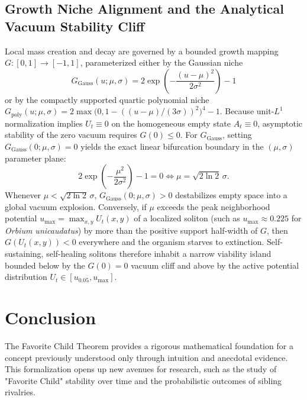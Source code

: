 \documentclass[12pt]{article}
\begin{document}
\subsection{Growth Niche Alignment and the Analytical Vacuum Stability Cliff}

Local mass creation and decay are governed by a bounded growth mapping \( G : [0, 1] \to [-1, 1] \), parameterized either by the Gaussian niche
\begin{equation}
G_{\text{Gauss}}(u; \mu, \sigma) = 2 \exp\!\left(-\frac{(u - \mu)^2}{2\sigma^2}\right) - 1
\end{equation}
or by the compactly supported quartic polynomial niche \( G_{\text{poly}}(u; \mu, \sigma) = 2 \max\!\bigl(0, 1 - ((u - \mu)/(3\sigma))^2\bigr)^4 - 1 \). Because unit-\( L^1 \) normalization implies \( U_t \equiv 0 \) on the homogeneous empty state \( A_t \equiv 0 \), asymptotic stability of the zero vacuum requires \( G(0) \le 0 \). For \( G_{\text{Gauss}} \), setting \( G_{\text{Gauss}}(0; \mu, \sigma) = 0 \) yields the exact linear bifurcation boundary in the \( (\mu, \sigma) \) parameter plane:
\begin{equation}
2 \exp\!\left(-\frac{\mu^2}{2\sigma^2}\right) - 1 = 0 \iff \mu = \sqrt{2 \ln 2}\,\sigma.
\end{equation}
Whenever \( \mu < \sqrt{2 \ln 2}\,\sigma \), \( G_{\text{Gauss}}(0; \mu, \sigma) > 0 \) destabilizes empty space into a global vacuum explosion. Conversely, if \( \mu \) exceeds the peak neighborhood potential \( u_{\max} = \max_{x, y} U_t(x, y) \) of a localized soliton (such as \( u_{\max} \approx 0.225 \) for \textit{Orbium unicaudatus}) by more than the positive support half-width of \( G \), then \( G(U_t(x, y)) < 0 \) everywhere and the organism starves to extinction. Self-sustaining, self-healing solitons therefore inhabit a narrow viability island bounded below by the \( G(0) = 0 \) vacuum cliff and above by the active potential distribution \( U_t \in [u_{0.05}, u_{\max}] \).

\section{Conclusion}

The Favorite Child Theorem provides a rigorous mathematical foundation for a concept previously understood only through intuition and anecdotal evidence. This formalization opens up new avenues for research, such as the study of "Favorite Child" stability over time and the probabilistic outcomes of sibling rivalries.
\end{document}
